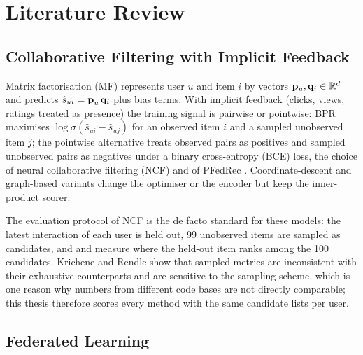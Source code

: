 \chapter{Literature Review}
\label{ch:literature}

\section{Collaborative Filtering with Implicit Feedback}
\label{sec:lit-cf}

Matrix factorisation (MF) represents user $u$ and item $i$ by vectors $\mathbf{p}_u, \mathbf{q}_i \in
\mathbb{R}^d$ and predicts $\hat{s}_{ui} = \mathbf{p}_u^\top \mathbf{q}_i$ plus bias terms. With implicit feedback
(clicks, views, ratings treated as presence) the training signal is pairwise or pointwise: BPR
\cite{rendle2009bpr} maximises $\log\sigma(\hat{s}_{ui} - \hat{s}_{uj})$ for an observed item
$i$ and a sampled unobserved item $j$; the pointwise alternative treats observed pairs as
positives and sampled unobserved pairs as negatives under a binary cross-entropy (BCE) loss, the
choice of neural collaborative filtering (NCF) \cite{he2017ncf} and of PFedRec
\cite{zhang2023pfedrec}. Coordinate-descent and graph-based variants
\cite{bayer2016implicit,he2020lightgcn} change the optimiser or the encoder but keep the
inner-product scorer.

The evaluation protocol of NCF is the de facto standard for these models: the latest
interaction of each user is held out, 99 unobserved items are sampled as candidates, and \hr{}
and \ndcg{} measure where the held-out item ranks among the 100 candidates. Krichene and Rendle
\cite{krichene2020sampled} show that sampled metrics are inconsistent with their exhaustive
counterparts and are sensitive to the sampling scheme, which is one reason why numbers from
different code bases are not directly comparable; this thesis therefore scores every method
with the same candidate lists per user.

\section{Federated Learning}
\label{sec:lit-fl}

